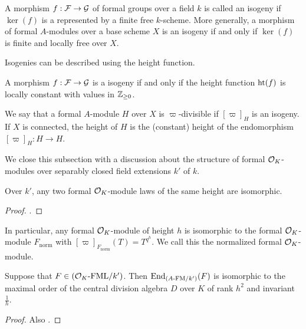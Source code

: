 \documentclass[../main.tex]{subfiles}
\begin{document}
\begin{defi}[Isogeny]
  A morphism $f: \mathcal{F} \to \mathcal{G}$ of formal groups over a field $k$ is called an isogeny if
  $\ker(f)$ is a represented by a finite free $k$-scheme. More generally, a
  morphism of formal $A$-modules over a base scheme $X$ is an isogeny if and
  only if $\ker(f)$ is finite and locally free over $X$. 
\end{defi}

Isogenies can be described using the height function.

\begin{lem}
  A morphism $f: \mathcal{F} \to \mathcal{G}$ is a isogeny if and only if the height 
  function $\textnormal{ht}(f)$ is locally constant with values in $\mathbb{Z}_{\geq 0}$. 
\end{lem}

\begin{defi}
  We say that a formal $A$-module $H$ over $X$ is $\varpi$-divisible if 
  $[\varpi]_H$ is an isogeny. If $X$ is connected, the height of $H$ is the
  (constant) height of the endomorphism $[\varpi]_H: H \to H$. 
\end{defi}

We close this subsection with a discussion about the structure of 
formal $\mathcal{O}_K$-modules over separably closed field extensions $k'$ of
$k$. 
\begin{prop}\label{prop:classificationofmodulelawsbyheight}
  Over $k'$, any two formal $\mathcal{O}_K$-module laws of the same height are isomorphic.
\begin{proof}
  \cite[Proposition 1.7]{drinfel1974elliptic}.
\end{proof}
\end{prop}
In particular, any formal $\mathcal{O}_K$-module of height $h$ is isomorphic to 
the formal $\mathcal{O}_K$-module $F_\mathrm{norm}$ with $[\varpi]_{F_\mathrm{norm}}(T) =
  T^{q^h}$. We call this the normalized formal $\mathcal{O}_K$-module.

\begin{prop}\label{prop:EndomorphismsOfFormalModulesOverksep}
  Suppose that $F \in {({\mathcal{O}_K}\text-\allowbreak\mathrm{FML}/{k'})}$. Then $\operatorname{End}_{{({A}\text-\allowbreak\mathrm{FM}/{k'})}}(F)$ is 
  isomorphic to the maximal order
  of the central division algebra $D$ over $K$ of rank $h^2$ and invariant
  $\frac 1h$.
\begin{proof}
  Also \cite[Proposition 1.7]{drinfel1974elliptic}. 
\end{proof}
\end{prop}
\end{document}
